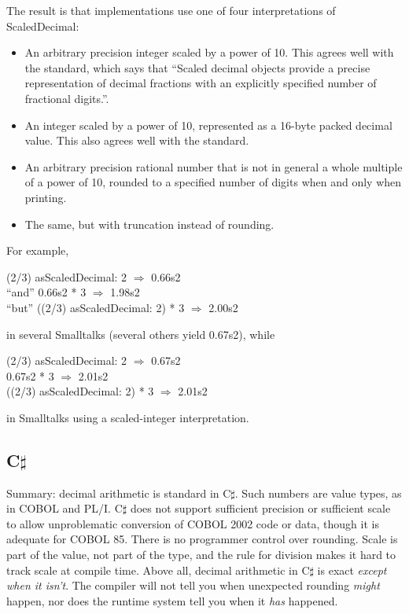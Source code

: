 \documentclass{article}
\begin{document}
The result is that implementations use one of four interpretations
of ScaledDecimal:
\begin{itemize}
\item An arbitrary precision integer scaled by a power of 10.
This agrees well with the standard, which says that
``Scaled decimal objects provide a precise representation of decimal
fractions with an explicitly specified number of fractional digits.''.
\item An integer scaled by a power of 10, represented as a 16-byte
packed decimal value.  This also agrees well with the standard.
\item An arbitrary precision rational number that is not in general
a whole multiple of a power of 10, rounded to a specified number of
digits when and only when printing.
\item The same, but with truncation instead of rounding.
\end{itemize}
For example,
\begin{tabbing}
(2/3) asScaledDecimal: 2 $\Longrightarrow$ 0.66s2\\
``and'' 0.66s2 * 3 $\Longrightarrow$ 1.98s2\\
``but'' ((2/3) asScaledDecimal: 2) * 3 $\Longrightarrow$ 2.00s2
\end{tabbing}
in several Smalltalks (several others yield 0.67s2), while
\begin{tabbing}
(2/3) asScaledDecimal: 2 $\Longrightarrow$ 0.67s2\\
0.67s2 * 3 $\Longrightarrow$ 2.01s2\\
((2/3) asScaledDecimal: 2) * 3 $\Longrightarrow$ 2.01s2
\end{tabbing}
in Smalltalks using a scaled-integer interpretation.


\subsection{C$\sharp$}

Summary: decimal arithmetic is standard in C$\sharp$.
Such numbers are value types, as in COBOL and PL/I.
C$\sharp$ does not support sufficient precision or sufficient scale
to allow unproblematic conversion of COBOL 2002 code or
data, though it is adequate for COBOL 85.  There is no
programmer control over rounding.  Scale is part of the
value, not part of the type, and the rule for division
makes it hard to track scale at compile time.  Above all,
decimal arithmetic in C$\sharp$ is exact {\it except when
it isn't}.  The compiler will not tell you when unexpected
rounding {\it might} happen, nor does the runtime system
tell you when it {\it has} happened.
\end{document}
